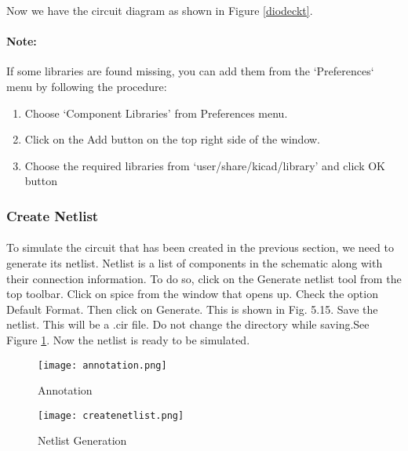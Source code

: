 Now we have the circuit diagram as shown in Figure \ref{diodeckt}.


\paragraph{Note:} If some libraries are found missing, you can add them from the `Preferences` menu by following the procedure: 

\begin{enumerate}
\item
Choose `Component Libraries' from Preferences menu.

\item
Click on the Add button on the top right side of the window.

\item
Choose the required libraries from `user/share/kicad/library' and click OK button

\end{enumerate}

\subsubsection{Create Netlist}

\paragraph{}To simulate the circuit that has been created in the previous section, we need to generate
its netlist. Netlist is a list of components in the schematic along with their connection
information. To do so, click on the Generate netlist tool from the top toolbar. Click on
spice from the window that opens up. Check the option Default Format. Then click
on Generate. This is shown in Fig. 5.15. Save the netlist. This will be a .cir file. Do
not change the directory while saving.See Figure \ref{createnetlist}.
 Now the netlist is ready to be simulated. 
\begin{figure}
\begin{minipage}{.5\textwidth}
  \centering
  \texttt{[image: annotation.png]}
  \caption{Annotation}
  \label{annotation}
\end{minipage}%
\begin{minipage}{.5\textwidth}
  \centering
  \texttt{[image: createnetlist.png]}
  \caption{Netlist Generation}
  \label{createnetlist}
\end{minipage}
\end{figure}

